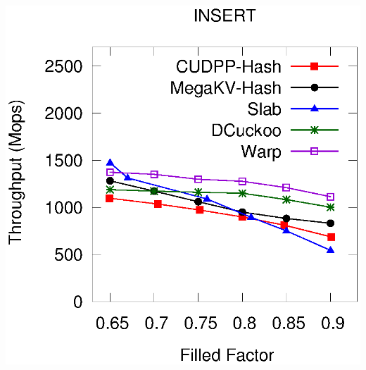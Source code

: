 \begin{minipage}{\textwidth}
\begin{minipage}[b]{0.49\textwidth}
\begin{minipage}{0.49\linewidth}
			\centerline{}
		\end{minipage}
	\end{minipage}
\end{minipage}

\begin{minipage}{\textwidth}
	\begin{minipage}[b]{0.49\textwidth}\centering
		\begin{minipage}{0.49\textwidth}\centering
			\includegraphics[width=\textwidth]{../pic/static-load_factor/twitter/insert.eps}
			\centerline{}
		\end{minipage}
		\begin{minipage}{0.49\textwidth}\centering

\end{minipage}
\end{minipage}
\end{minipage}
